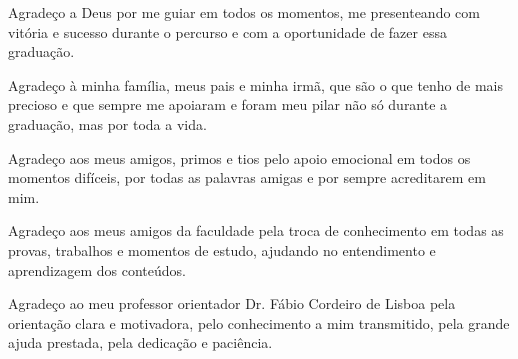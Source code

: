 \begin{agradecimentos}
Agradeço a Deus por me guiar em todos os momentos, me presenteando com vitória e sucesso durante o percurso e com a oportunidade de fazer essa graduação.

Agradeço à minha família, meus pais e minha irmã, que são o que tenho de mais precioso e que sempre me apoiaram e foram meu pilar não só durante a graduação, mas por toda a vida. 

Agradeço aos meus amigos, primos e tios pelo apoio emocional em todos os momentos difíceis, por todas as palavras amigas e por sempre acreditarem em mim.

Agradeço aos meus amigos da faculdade pela troca de conhecimento em todas as provas, trabalhos e momentos de estudo, ajudando no entendimento e aprendizagem dos conteúdos.

Agradeço ao meu professor orientador Dr. Fábio Cordeiro de Lisboa pela orientação clara e motivadora, pelo conhecimento a mim transmitido, pela grande ajuda prestada, pela dedicação e paciência.


\end{agradecimentos}
